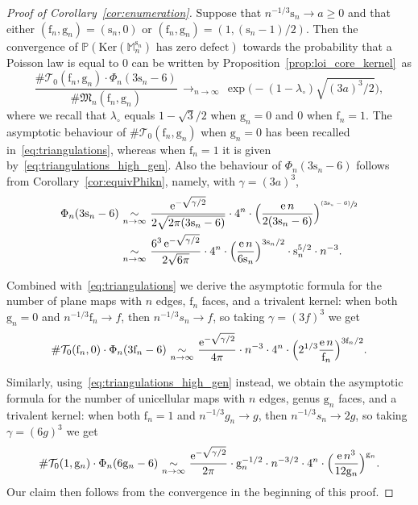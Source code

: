 \documentclass[10pt]{amsart}
\newcommand{\psfrac}[2]{\sfrac{(#1)}{#2}}
\theoremstyle{plain}
\theoremstyle{definition}
\theoremstyle{remark}
\newcommand{\e}{\operatorname{e}}
\newcommand{\Mapb}{\mathbb{M}}
\newcommand{\face}{\mathrm{f}}
\newcommand{\gen}{\mathrm{g}}
\newcommand{\spar}{\mathrm{s}}
\newcommand{\cv}[1][n]{\,\mathop{\longrightarrow}^{}_{#1 \to \infty}\,}
\newcommand{\equi}[1][n]{\,\mathop{\sim}^{}_{#1 \to \infty}\,}
\begin{document}
\begin{proof}[Proof of Corollary~\ref{cor:enumeration}]
Suppose that $n^{-1/3} \spar_n \!\to\! a \!\ge\! 0$ and that either $(\face_n, \gen_n) \!=\! (\spar_n, 0)$ or $(\face_n, \gen_n) \!=\! (1, (\spar_n-1)/2)$. Then the convergence of $\mathbb{P}(\mathrm{Ker}(\Mapb_{n}^{\spar_{n}}) \mbox{ has zero defect})$ towards the probability that a Poisson law is equal to $0$ can be written by Proposition~\ref{prop:loi_core_kernel}~as
\[
\frac{\# \mathcal{T}_0(\face_n,\gen_n) \cdot \Phi_{n}(3\spar_n-6 )}{\# \mathfrak{M}_n(\face_n,\gen_n)}
\cv \exp\bigl(- (1-\lambda_{\circ}) \sqrt{(3a)^3 / 2}\bigr),
\]
where we recall that $\lambda_\circ$ equals $1 - \sqrt{3}/2$ when $\gen_n=0$ and $0$ when $\face_n=1$.
The asymptotic behaviour of $\# \mathcal{T}_0(\face_n,\gen_n)$ when $\gen_n=0$ has been recalled in~\eqref{eq:triangulations}, whereas when $\face_n=1$ it is given by~\eqref{eq:triangulations_high_gen}. Also the behaviour of $\Phi_{n}(3\spar_n-6 )$ follows from Corollary~\ref{cor:equivPhikn}, namely, with $\gamma = (3a)^3$,\vspace*{-3pt}
\begin{align*}
\Phi_{n}(3 \spar_{n}-6)
& \equi \frac{\e^{- \sqrt{\gamma/2}}}{2\sqrt{2 \pi (3\spar_{n}-6)}} \cdot 4^{n} \cdot \Bigl(\frac{\e n}{2 (3\spar_{n}-6)}\Bigr)^{ \psfrac{3\spar_{n}-6}{2}}
\\
& \equi \frac{6^3 \e^{- \sqrt{\gamma/2}}}{2\sqrt{6 \pi}} \cdot 4^{n} \cdot \Bigl(\frac{\e n}{6 \spar_{n}}\Bigr)^{3\spar_{n}/2} \cdot \spar_{n}^{5/2} \cdot n^{-3}.
\end{align*}

Combined with~\eqref{eq:triangulations} we derive the asymptotic formula for the number of plane maps with $n$ edges, $\face_n$ faces, and a trivalent kernel: when both $\gen_n=0$ and $n^{-1/3} \face_n \to f$, then $n^{-1/3} s_{n} \rightarrow f$, so taking $\gamma=(3f)^{3}$ we get
\[
\#\mathcal{T}_0(\face_n,0) \cdot \Phi_{n}(3 \face_{n}-6)
\equi \frac{\e^{- \sqrt{\gamma/2}}}{4 \pi} \cdot n^{-3} \cdot 4^{n} \cdot \Bigl(2^{1/3} \frac{\e n}{\face_{n}}\Bigr)^{3\face_{n}/2}.
\]

Similarly, using~\eqref{eq:triangulations_high_gen} instead, we obtain the asymptotic formula for the number of unicellular maps with $n$ edges, genus $\gen_n$ faces, and a trivalent kernel: when both $\face_n=1$ and $n^{-1/3} g_{n} \rightarrow g$, then $n^{-1/3} s_{n} \rightarrow 2g$, so taking $\gamma=(6g)^{3}$ we get
\[
\#\mathcal{T}_0(1,\gen_n) \cdot \Phi_{n}(6 \gen_{n}-6)
\equi \frac{ \e^{- \sqrt{\gamma/2}}}{2\pi } \cdot \gen_n^{-1/2} \cdot n^{-3/2} \cdot 4^{n} \cdot \Bigl(\frac{\e n^3}{12 \gen_n}\Bigr)^{\gen_n}.
\]
Our claim then follows from the convergence in the beginning of this proof.
\end{proof}
\end{document}
